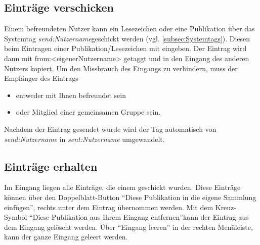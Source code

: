 \subsection{Einträge verschicken}
Einem befreundeten Nutzer kann ein Lesezeichen oder eine Publikation über das Systemtag \textit{send:Nutzername}geschickt werden 
(vgl. \autoref{subsec:Systemtags}). Diesen \tag beim Eintragen einer Publikation/Lesezeichen mit eingeben. Der Eintrag wird dann mit from:<eigenerNutzername> getaggt und in den Eingang des anderen Nutzers kopiert. Um den Missbrauch des Eingangs zu verhindern, muss der Empfänger des Eintrags
\begin{itemize}
    \item entweder mit Ihnen befreundet sein
    \item oder Mitglied einer gemeinsamen Gruppe sein.
\end{itemize}
Nachdem der Eintrag gesendet wurde wird der Tag automatisch von \textit{send:Nutzername} in \textit{sent:Nutzername}  umgewandelt.

\subsection{Einträge erhalten}
Im Eingang liegen alle Einträge, die einem geschickt wurden. Diese Einträge können über den Doppelblatt-Button \enquote{Diese Publikation in die eigene Sammlung einfügen}, rechts unter dem Eintrag übernommen werden. Mit dem Kreuz-Symbol \enquote{Diese Publikation aus Ihrem Eingang entfernen}kann der Eintrag aus dem Eingang gelöscht werden. Über \enquote{Eingang leeren} in der rechten Menüleiste, kann der ganze Eingang geleert werden.

